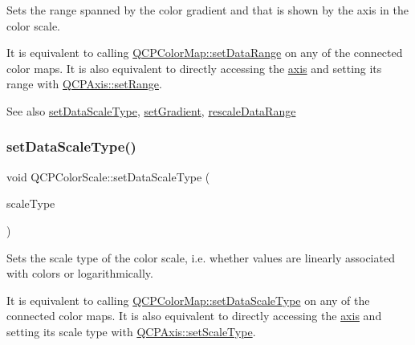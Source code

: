 Sets the range spanned by the color gradient and that is shown by the axis in the color scale.

It is equivalent to calling \mbox{\hyperlink{class_q_c_p_color_map_a980b42837821159786a85b4b7dcb8774}{Q\+C\+P\+Color\+Map\+::set\+Data\+Range}} on any of the connected color maps. It is also equivalent to directly accessing the \mbox{\hyperlink{class_q_c_p_color_scale_a39bdbdb3b212602a5a57f9f3ea444190}{axis}} and setting its range with \mbox{\hyperlink{class_q_c_p_axis_aebdfea5d44c3a0ad2b4700cd4d25b641}{Q\+C\+P\+Axis\+::set\+Range}}.

\begin{DoxySeeAlso}{See also}
\mbox{\hyperlink{class_q_c_p_color_scale_aeb6107d67dd7325145b2498abae67fc3}{set\+Data\+Scale\+Type}}, \mbox{\hyperlink{class_q_c_p_color_scale_a1f29583bb6f1e7f473b62fb712be3940}{set\+Gradient}}, \mbox{\hyperlink{class_q_c_p_color_scale_a425983db4478543924ddbd04ea20a356}{rescale\+Data\+Range}} 
\end{DoxySeeAlso}
\mbox{\label{class_q_c_p_color_scale_aeb6107d67dd7325145b2498abae67fc3}} 
\subsubsection{\texorpdfstring{set\+Data\+Scale\+Type()}{setDataScaleType()}}
{\footnotesize\ttfamily void Q\+C\+P\+Color\+Scale\+::set\+Data\+Scale\+Type (\begin{DoxyParamCaption}\item[{\mbox{\hyperlink{class_q_c_p_axis_a36d8e8658dbaa179bf2aeb973db2d6f0}{Q\+C\+P\+Axis\+::\+Scale\+Type}}}]{scale\+Type }\end{DoxyParamCaption})}

Sets the scale type of the color scale, i.\+e. whether values are linearly associated with colors or logarithmically.

It is equivalent to calling \mbox{\hyperlink{class_q_c_p_color_map_a9d20aa08e3c1f20f22908c45b9c06511}{Q\+C\+P\+Color\+Map\+::set\+Data\+Scale\+Type}} on any of the connected color maps. It is also equivalent to directly accessing the \mbox{\hyperlink{class_q_c_p_color_scale_a39bdbdb3b212602a5a57f9f3ea444190}{axis}} and setting its scale type with \mbox{\hyperlink{class_q_c_p_axis_adef29cae617af4f519f6c40d1a866ca6}{Q\+C\+P\+Axis\+::set\+Scale\+Type}}.

